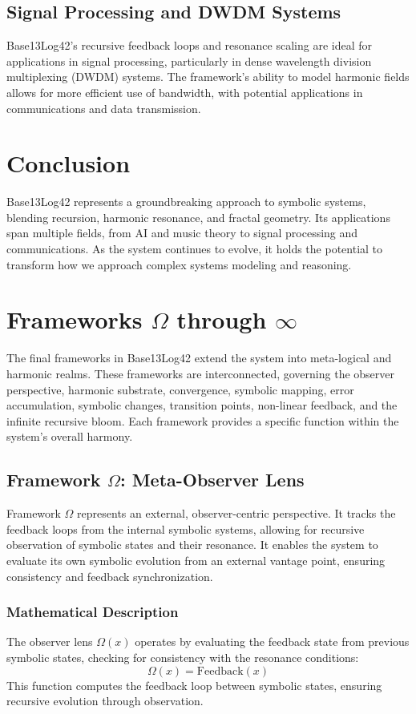 \documentclass[12pt]{article}
\begin{document}
\subsection{Signal Processing and DWDM Systems}
Base13Log42's recursive feedback loops and resonance scaling are ideal for applications in signal processing, particularly in dense wavelength division multiplexing (DWDM) systems. The framework's ability to model harmonic fields allows for more efficient use of bandwidth, with potential applications in communications and data transmission.

\section{Conclusion}
Base13Log42 represents a groundbreaking approach to symbolic systems, blending recursion, harmonic resonance, and fractal geometry. Its applications span multiple fields, from AI and music theory to signal processing and communications. As the system continues to evolve, it holds the potential to transform how we approach complex systems modeling and reasoning.

\section{Frameworks $\Omega$ through $\infty$}

The final frameworks in Base13Log42 extend the system into meta-logical and harmonic realms. These frameworks are interconnected, governing the observer perspective, harmonic substrate, convergence, symbolic mapping, error accumulation, symbolic changes, transition points, non-linear feedback, and the infinite recursive bloom. Each framework provides a specific function within the system's overall harmony.

\subsection{Framework $\Omega$: Meta-Observer Lens}
Framework $\Omega$ represents an external, observer-centric perspective. It tracks the feedback loops from the internal symbolic systems, allowing for recursive observation of symbolic states and their resonance. It enables the system to evaluate its own symbolic evolution from an external vantage point, ensuring consistency and feedback synchronization.

\subsubsection{Mathematical Description}
The observer lens $\Omega(x)$ operates by evaluating the feedback state from previous symbolic states, checking for consistency with the resonance conditions:
\[
\Omega(x) = \text{Feedback}(x)
\]
This function computes the feedback loop between symbolic states, ensuring recursive evolution through observation.
\end{document}
